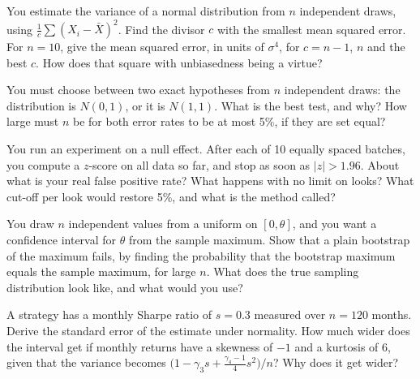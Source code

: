 \begin{question}\label{iq:iv1:statistics:27}
You estimate the variance of a normal distribution from $n$ independent draws, using $\frac{1}{c}\sum (X_i - \bar{X})^2$. Find the divisor $c$ with the smallest mean squared error. For $n = 10$, give the mean squared error, in units of $\sigma^4$, for $c = n - 1$, $n$ and the best $c$. How does that square with unbiasedness being a virtue?
\end{question}

\begin{question}\label{iq:iv1:statistics:28}
You must choose between two exact hypotheses from $n$ independent draws: the distribution is $N(0, 1)$, or it is $N(1, 1)$. What is the best test, and why? How large must $n$ be for both error rates to be at most 5\%, if they are set equal?
\end{question}

\begin{question}\label{iq:iv1:statistics:29}
You run an experiment on a null effect. After each of 10 equally spaced batches, you compute a $z$-score on all data so far, and stop as soon as $|z| > 1.96$. About what is your real false positive rate? What happens with no limit on looks? What cut-off per look would restore 5\%, and what is the method called?
\end{question}

\begin{question}\label{iq:iv1:statistics:30}
You draw $n$ independent values from a uniform on $[0, \theta]$, and you want a confidence interval for $\theta$ from the sample maximum. Show that a plain bootstrap of the maximum fails, by finding the probability that the bootstrap maximum equals the sample maximum, for large $n$. What does the true sampling distribution look like, and what would you use?
\end{question}

\begin{question}\label{iq:iv1:statistics:31}
A strategy has a monthly Sharpe ratio of $s = 0.3$ measured over $n = 120$ months. Derive the standard error of the estimate under normality. How much wider does the interval get if monthly returns have a skewness of $-1$ and a kurtosis of 6, given that the variance becomes $\bigl(1 - \gamma_3 s + \frac{\gamma_4 - 1}{4}s^2\bigr)/n$? Why does it get wider?
\end{question}

